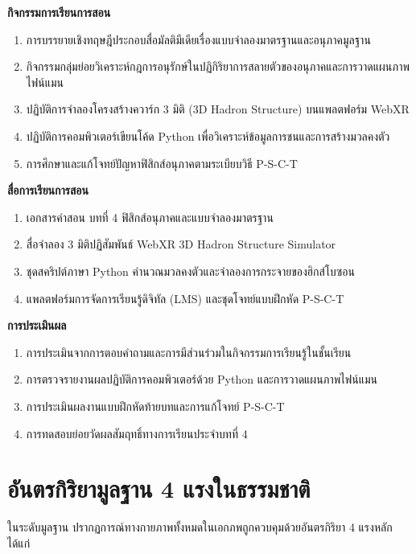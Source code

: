 \begin{lessonplanbox}
\noindent\textbf{กิจกรรมการเรียนการสอน}
\begin{enumerate}
    \item การบรรยายเชิงทฤษฎีประกอบสื่อมัลติมีเดียเรื่องแบบจำลองมาตรฐานและอนุภาคมูลฐาน
    \item กิจกรรมกลุ่มย่อยวิเคราะห์กฎการอนุรักษ์ในปฏิกิริยาการสลายตัวของอนุภาคและการวาดแผนภาพไฟน์แมน
    \item ปฏิบัติการจำลองโครงสร้างควาร์ก 3 มิติ (3D Hadron Structure) บนแพลตฟอร์ม WebXR
    \item ปฏิบัติการคอมพิวเตอร์เขียนโค้ด Python เพื่อวิเคราะห์ข้อมูลการชนและการสร้างมวลคงตัว
    \item การศึกษาและแก้โจทย์ปัญหาฟิสิกส์อนุภาคตามระเบียบวิธี P-S-C-T
\end{enumerate}

\noindent\textbf{สื่อการเรียนการสอน}
\begin{enumerate}
    \item เอกสารคำสอน บทที่ 4 ฟิสิกส์อนุภาคและแบบจำลองมาตรฐาน
    \item สื่อจำลอง 3 มิติปฏิสัมพันธ์ WebXR 3D Hadron Structure Simulator
    \item ชุดสคริปต์ภาษา Python คำนวณมวลคงตัวและจำลองการกระจายของฮิกส์โบซอน
    \item แพลตฟอร์มการจัดการเรียนรู้ดิจิทัล (LMS) และชุดโจทย์แบบฝึกหัด P-S-C-T
\end{enumerate}

\noindent\textbf{การประเมินผล}
\begin{enumerate}
    \item การประเมินจากการตอบคำถามและการมีส่วนร่วมในกิจกรรมการเรียนรู้ในชั้นเรียน
    \item การตรวจรายงานผลปฏิบัติการคอมพิวเตอร์ด้วย Python และการวาดแผนภาพไฟน์แมน
    \item การประเมินผลงานแบบฝึกหัดท้ายบทและการแก้โจทย์ P-S-C-T
    \item การทดสอบย่อยวัดผลสัมฤทธิ์ทางการเรียนประจำบทที่ 4
\end{enumerate}
\end{lessonplanbox}
\newpage

\section{อันตรกิริยามูลฐาน 4 แรงในธรรมชาติ}

ในระดับมูลฐาน ปรากฏการณ์ทางกายภาพทั้งหมดในเอกภพถูกควบคุมด้วยอันตรกิริยา 4 แรงหลัก ได้แก่

